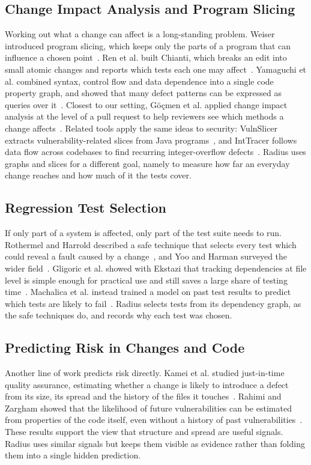 \documentclass[conference]{IEEEtran}
\begin{document}
\subsection{Change Impact Analysis and Program Slicing}
Working out what a change can affect is a long-standing problem. Weiser introduced program slicing, which keeps only the parts of a program that can influence a chosen point~\cite{weiser1984slicing}. Ren et al. built Chianti, which breaks an edit into small atomic changes and reports which tests each one may affect~\cite{ren2004chianti}. Yamaguchi et al. combined syntax, control flow and data dependence into a single code property graph, and showed that many defect patterns can be expressed as queries over it~\cite{yamaguchi2014cpg}. Closest to our setting, G\"o\c{c}men et al. applied change impact analysis at the level of a pull request to help reviewers see which methods a change affects~\cite{gocmen2025cia}. Related tools apply the same ideas to security: VulnSlicer extracts vulnerability-related slices from Java programs~\cite{10917269}, and IntTracer follows data flow across codebases to find recurring integer-overflow defects~\cite{10554909}. Radius uses graphs and slices for a different goal, namely to measure how far an everyday change reaches and how much of it the tests cover.

\subsection{Regression Test Selection}
If only part of a system is affected, only part of the test suite needs to run. Rothermel and Harrold described a safe technique that selects every test which could reveal a fault caused by a change~\cite{rothermel1997safe}, and Yoo and Harman surveyed the wider field~\cite{yoo2012regression}. Gligoric et al. showed with Ekstazi that tracking dependencies at file level is simple enough for practical use and still saves a large share of testing time~\cite{gligoric2015ekstazi}. Machalica et al. instead trained a model on past test results to predict which tests are likely to fail~\cite{machalica2019predictive}. Radius selects tests from its dependency graph, as the safe techniques do, and records why each test was chosen.

\subsection{Predicting Risk in Changes and Code}
Another line of work predicts risk directly. Kamei et al. studied just-in-time quality assurance, estimating whether a change is likely to introduce a defect from its size, its spread and the history of the files it touches~\cite{kamei2013jit}. Rahimi and Zargham showed that the likelihood of future vulnerabilities can be estimated from properties of the code itself, even without a history of past vulnerabilities~\cite{6502762}. These results support the view that structure and spread are useful signals. Radius uses similar signals but keeps them visible as evidence rather than folding them into a single hidden prediction.
\end{document}
